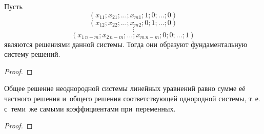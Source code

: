 Пусть 
\begin{equation*}
(x_{11}; x_{21}; \ldots; x_{m1}; 1; 0; \ldots; 0)
\end{equation*}
\begin{equation*}
(x_{12}; x_{22}; \ldots; x_{m2}; 0; 1; \ldots; 0)
\end{equation*}
\begin{equation*}
\vdots
\end{equation*}
\begin{equation*}
(x_{1\, n-m}; x_{2\, n-m}; \ldots; x_{m\, n-m}; 0; 0; \ldots; 1)
\end{equation*}
являются решениями данной системы. 
Тогда они образуют фундаментальную систему решений.
\begin{proof}

\end{proof}

\begin{theorem}
Общее решение неоднородной системы линейных уравнений равно сумме её частного решения и~общего решения соответствующей однородной системы, т.\,е. с~теми~же самыми коэффициентами при~переменных.
\end{theorem}
\begin{proof}

\end{proof}